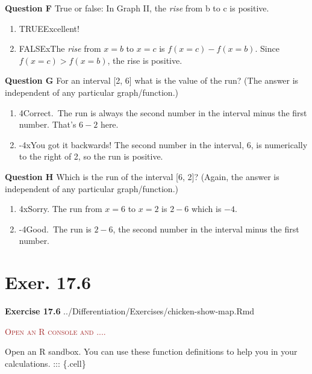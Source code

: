 \documentclass[
  letterpaper,
  DIV=11,
  numbers=noendperiod,
  oneside]{article}
\providecommand{\tightlist}{%
  \setlength{\itemsep}{0pt}\setlength{\parskip}{0pt}}\usepackage{longtable,booktabs,array}
\newenvironment{scaffolding}%
{%
\textcolor{brown}{\hrulefill}%
  \par\vspace{.3\baselineskip}%
  \textcolor{brown}{\scshape Open an R console and ....}%
  \par\vspace{\baselineskip}%
}%
{\textcolor{brown}{\hrulefill}}
\begin{document}
\begin{multicols}{2}
\textbf{Question F} True or false: In Graph II, the \emph{rise} from b
to c is positive.

\begin{enumerate}
\def\labelenumi{\roman{enumi}.}
\tightlist
\item
  {TRUE{Excellent!~}}\\
\item
  {FALSE{xThe \emph{rise} from \(x=b\) to \(x=c\) is
  \(f(x = c) - f(x = b)\). Since \(f(x=c) > f(x=b)\), the rise is
  positive.}}
\end{enumerate}

\textbf{Question G} For an interval {[}2, 6{]} what is the value of the
run? (The answer is independent of any particular graph/function.)

\begin{enumerate}
\def\labelenumi{\roman{enumi}.}
\tightlist
\item
  {4{Correct.~The run is always the second number in the interval minus
  the first number. That's \(6 - 2\) here.}}\\
\item
  {-4{xYou got it backwards! The second number in the interval, 6, is
  numerically to the right of 2, so the run is positive.}}
\end{enumerate}

\textbf{Question H} Which is the run of the interval {[}6, 2{]}? (Again,
the answer is independent of any particular graph/function.)

\begin{enumerate}
\def\labelenumi{\roman{enumi}.}
\tightlist
\item
  {4{xSorry. The run from \(x=6\) to \(x=2\) is \(2 - 6\) which is
  \(-4\).}}\\
\item
  {-4{Good.~The run is \(2 - 6\), the second number in the interval
  minus the first number.}}
\end{enumerate}

\hypertarget{exer.-17.6}{%
\section*{Exer. 17.6}\label{exer.-17.6}}

\textbf{Exercise 17.6} ../Differentiation/Exercises/chicken-show-map.Rmd

\begin{scaffolding}

Open an R sandbox. You can use these function definitions to help you in
your calculations. ::: \{.cell\}


\end{scaffolding}
\end{multicols}
\end{document}
